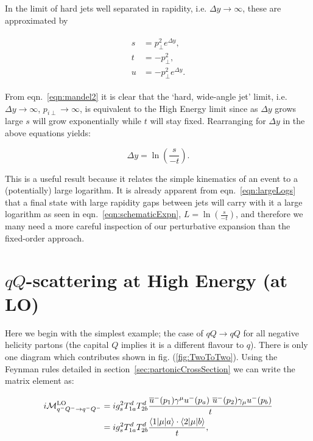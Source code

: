 	In the limit of hard jets well separated in rapidity, i.e. $\Delta y\rightarrow\infty$,
	these are approximated by

	\begin{align}
	\begin{split}
		s &= p_\perp^2 e^{\Delta y},\\
		t &= -p_\perp^2,\\
		u &= -p_\perp^2 e^{\Delta y}.
		\label{eqn:mandel2}
	\end{split}
	\end{align}

	From  eqn.~\eqref{eqn:mandel2} it is clear that the `hard, wide-angle jet' limit, i.e. $\Delta y\to\infty$,
	$p_{i\perp}\to\infty$, is equivalent to the High Energy limit since as $\Delta y$ grows large $s$ will
	grow exponentially while $t$ will stay fixed.  Rearranging for $\Delta y$ in the above equations yields:

	\begin{equation}
		\Delta y = \ln \left(\frac{s}{-t}\right).
		\label{eqn:largeLogs}
	\end{equation}

	This is a useful result because it relates the simple kinematics of an event to a (potentially)
	large logarithm.  It is already apparent from eqn.~\eqref{eqn:largeLogs} that a final state
	with large rapidity gaps between jets will carry with it a large logarithm as seen in
	eqn.~\eqref{eqn:schematicExpn}, $L=\ln \left(\frac{s}{-t}\right)$, and therefore we many need a
	more careful inspection of our perturbative expansion than the fixed-order approach.

\section{$qQ$-scattering at High Energy (at LO)}
	\label{sec:qQScat}

	Here we begin with the simplest example; the case of $qQ\rightarrow qQ$ for all negative helicity partons
	(the capital $Q$ implies it is a different flavour to $q$).  There is only one diagram which contributes shown
	in fig. (\ref{fig:TwoToTwo}).  Using the Feynman rules detailed in section~\ref{sec:partonicCrossSection} we can
	write the matrix element as:

	\begin{align}
		i\mathcal{M}_{q^-Q^-\rightarrow q^-Q^-}^{\text{LO}} &= ig_s^2T^d_{1a}T^d_{2b}
		\frac{\overline{u}^-(p_1)\gamma^\mu
		  u^-(p_a)\text{ }\overline{u}^-(p_2)\gamma_\mu u^-(p_b)}{t}\\
		  &= ig_s^2T^d_{1a}T^d_{2b}\frac{\langle 1 | \mu | a \rangle\cdot\langle 2 | \mu | b \rangle}{t},
		  \label{eqn:similarBrackets}
	\end{align}

